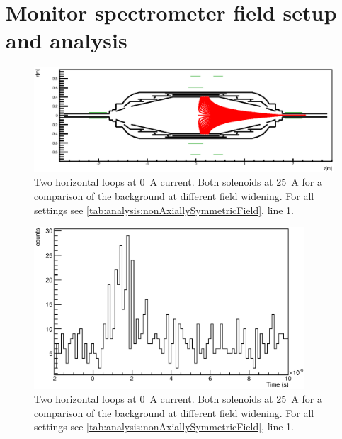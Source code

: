 \section{Monitor spectrometer field setup and analysis}
\label{ch:annex:sec:A3}
\begin{figure}[h]
\centering
			\centerline{\includegraphics[width = 1.3\linewidth]{graphics/analysis/monSpec/fieldSimulation/AA.eps}}
	
	\caption[\SI{50}{\ampere} loops]{Two horizontal loops at \SI{0}{\ampere} current. Both solenoids at \SI{25}{\ampere} for a comparison of the background at different field widening. For all settings see \ref{tab:analysis:nonAxiallySymmetricField}, line 1.}
	\label{fig:AAf}
\end{figure}

\begin{figure}[h]
\centering
	\includegraphics[width = 0.9\textwidth]{graphics/analysis/monSpec/AA.eps}
	\caption[\SI{50}{\ampere} loops]{Two horizontal loops at \SI{0}{\ampere} current. Both solenoids at \SI{25}{\ampere} for a comparison of the background at different field widening. For all settings see \ref{tab:analysis:nonAxiallySymmetricField}, line 1.}
	\label{fig:AA}
\end{figure}
\clearpage



